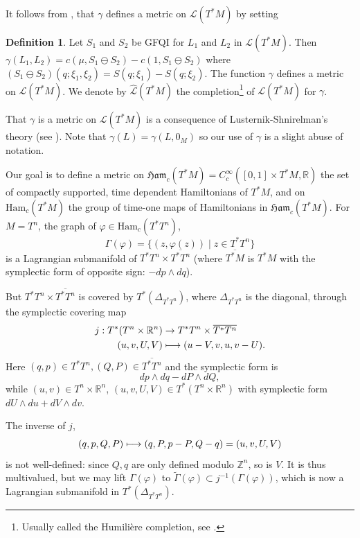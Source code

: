 \documentclass[JEP,XML,SOM,NoFloatCountersInSection,Unicode,published]{cedram}
\newcommand\mto{\mathchoice{\longmapsto}{\mapsto}{\mapsto}{\mapsto}}
\numberwithin{equation}{section}
\newcommand {\Ham}{{\mathfrak {Ham}}}
\newcommand {\DHam}{\mathrm{Ham}}
\newcommand{\GFQI}{\textup{GFQI}\xspace}
\theoremstyle{plain}
\theoremstyle{definition}
\newtheorem{definition}[theorem]{Definition}
\theoremstyle{remark}
\begin{document}
It follows from \cite{Viterbo-STAGGF}, that $\gamma$ defines a metric on $\mathcal{L}(T^{*}M)$ by
setting

\begin{definition}\label{Def-4.5} Let $S_{1}$ and $S_{2}$ be \GFQI for $L_{1}$ and $L_{2}$ in ${\mathcal L}(T^{*}M)$. Then $\gamma (L_{1},L_{2}) = c(\mu, S_{1} \ominus S_{2})
- c (1,S_{1}\ominus S_{2})$ where $(S_{1}\ominus S_{2}) (q; \xi_{1},\xi_{2}) = S(q;\xi_{1})
- S (q; \xi_{2})$. The function $\gamma$ defines a metric on ${\mathcal L}(T^{*}M)$.
We denote by $\widehat {\mathcal L}(T^*M)$ the completion\footnote{Usually called the Humilière completion, see \cite{Humiliere}.} of ${\mathcal L}(T^{*}M)$ for $\gamma$.
\end{definition}

That $\gamma$ is a metric on $\mathcal L(T^*M)$ is a
consequence of Lusternik-Shnirelman's theory (see \cite{Viterbo-STAGGF}).
Note that $\gamma(L)=\gamma(L, 0_{M})$ so our use of $\gamma$ is a slight abuse of notation.

Our goal is to define a metric on $\Ham_{c} (T^{*}M)=C_{c}^{\infty}([0,1]\times T^*M, {\mathbb R})$ the set of compactly supported, time dependent
Hamiltonians of $T^{*}M$, and on ${\DHam}_{c}(T^{*}M)$ the group of time-one maps of Hamiltonians in $\Ham_{c} (T^{*}M)$.
\label{Define-j} For $M = T^{n}$, the graph of $\varphi \in \DHam_c(T^*T^n)$,
\[
\Gamma (\varphi) = \{ (z, \varphi(z)) \mid z \in T^{*}T^{n}\}
\]
is a Lagrangian submanifold of $T^{*}T^{n}\times \overline{T^{*}
T^{n}}$ (where $\overline{T^{*}M}$ is $T^{*}M$ with the symplectic
form of opposite sign: $-dp \wedge dq$).

But $T^{*}T^{n} \times \overline{T^{*}T^{n}}$ is covered by
$T^{*}(\Delta_{T^{*}T^{n}})$, where $\Delta_{T^{*}T^{n}}$ is the
diagonal, through the symplectic covering map
\begin{align*}
j: T^*(T^n\times {\mathbb R} ^n) &\to T^*T^n \times \overline {T^*T^n} \\
(u,v,U,V) &\mto (u-V,v,u,v-U).
\end{align*}
Here $(q,p)\in T^*T^n, (Q,P) \in \overline {T^*T^n}$ and the symplectic form is
\[
dp\wedge dq-dP\wedge dQ,
\]
while $(u,v) \in T^n\times {\mathbb R} ^n$, $(u,v,U,V) \in T^*(T^n\times {\mathbb R} ^n) $ with symplectic form $dU\wedge du+ dV\wedge dv$.

The inverse of $j$,
\[
(q,p,Q,P) \mto (q,P,p-P,Q-q)=(u,v,U,V)
\]
is not well-defined: since $Q,q$ are only defined modulo $ {\mathbb Z}^n$, so is $V$. It is thus multivalued, but we may lift $\Gamma(\varphi)$ to
$\widetilde\Gamma(\varphi) \subset j^{-1}(\Gamma(\varphi))$, which is now a Lagrangian submanifold in
$T^{*}(\Delta_{T^{*}T^{n}})$.
\end{document}
